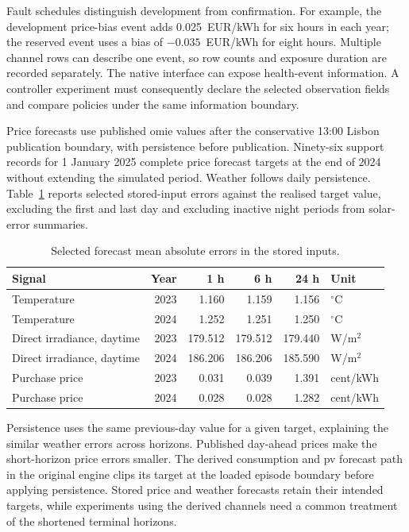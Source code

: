Fault schedules distinguish development from confirmation. For example, the development price-bias event adds 0.025~EUR/kWh for six hours in each year; the reserved event uses a bias of $-0.035$~EUR/kWh for eight hours. Multiple channel rows can describe one event, so row counts and exposure duration are recorded separately. The native interface can expose health-event information. A controller experiment must consequently declare the selected observation fields and compare policies under the same information boundary.

Price forecasts use published \gls{omie} values after the conservative 13:00 Lisbon publication boundary, with persistence before publication. Ninety-six support records for 1 January 2025 complete price forecast targets at the end of 2024 without extending the simulated period. Weather follows daily persistence. Table~\ref{tab:app-portugal-forecasts} reports selected stored-input errors against the realised target value, excluding the first and last day and excluding inactive night periods from solar-error summaries.

\begin{table}[htbp]
\centering\small
\caption{Selected forecast mean absolute errors in the stored inputs.}
\label{tab:app-portugal-forecasts}
\begin{tabularx}{\textwidth}{@{}Xrrrrl@{}}
\toprule
\textbf{Signal} & \textbf{Year} & \textbf{1 h} & \textbf{6 h} & \textbf{24 h} & \textbf{Unit}\\
\midrule
Temperature & 2023 & 1.160 & 1.159 & 1.156 & $^\circ$C\\
Temperature & 2024 & 1.252 & 1.251 & 1.250 & $^\circ$C\\
Direct irradiance, daytime & 2023 & 179.512 & 179.512 & 179.440 & W/m$^2$\\
Direct irradiance, daytime & 2024 & 186.206 & 186.206 & 185.590 & W/m$^2$\\
Purchase price & 2023 & 0.031 & 0.039 & 1.391 & cent/kWh\\
Purchase price & 2024 & 0.028 & 0.028 & 1.282 & cent/kWh\\
\bottomrule
\end{tabularx}
\end{table}

Persistence uses the same previous-day value for a given target, explaining the similar weather errors across horizons. Published day-ahead prices make the short-horizon price errors smaller. The derived consumption and \gls{pv} forecast path in the original engine clips its target at the loaded episode boundary before applying persistence. Stored price and weather forecasts retain their intended targets, while experiments using the derived channels need a common treatment of the shortened terminal horizons.

